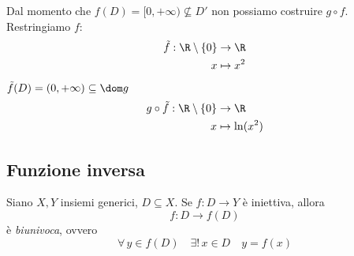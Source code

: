 {    Dal momento che $ f(D)=[0, + \infty) \nsubseteq D' $ non possiamo costruire $ g \circ f $. Restringiamo $ f $: \begin{align*}
    \tilde{f}:\R\setminus\{0\} & \to \R \\
    x & \mapsto x^{2}
    \end{align*} $ \tilde{f}(D)=(0,+ \infty) \subseteq\dom g $ \begin{align*}
    g\circ\tilde{f}:\R\setminus\{0\} & \to \R \\
    x & \mapsto \ln(x^{2})
    \end{align*}

    \begin{center}
        \end{center}
}
\subsection{Funzione inversa}

Siano $ X, Y $ insiemi generici, $ D \subseteq X $. Se $ f:D\to Y $ è iniettiva, allora \[
    f:D\to f(D)
\] è \textit{biunivoca}, ovvero \begin{equation}
    \forall\,y \in f(D)\quad \exists!\, x \in D\quad y=f(x)
\end{equation}

